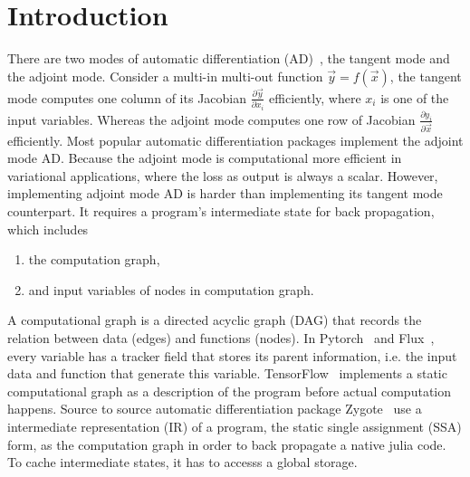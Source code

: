 \documentclass[aps,twocolumn,longbibliography,english,superscriptaddress,prr]{revtex4-1}
\newcommand{\<}{\langle}
\renewcommand{\>}{\rangle}
\newcommand{\vx}{{\vec x}}
\newcommand{\vy}{{\vec y}}
\theoremstyle{definition}\newtheorem{definition}{\textit{Definition}}
\begin{document}
\section{Introduction}\label{sec:intro}
    There are two modes of automatic differentiation (AD)~\cite{Hascoet2013}, the tangent mode and the adjoint mode.
    Consider a multi-in multi-out function $\vy = f(\vx)$, the tangent mode computes one column of its Jacobian $\frac{\partial \vy}{\partial x_i}$ efficiently, where $x_i$ is one of the input variables.
Whereas the adjoint mode computes one row of Jacobian $\frac{\partial y_i}{\partial \vec{x}}$ efficiently.
Most popular automatic differentiation packages implement the adjoint mode AD. Because the adjoint mode is computational more efficient in variational applications, where the loss as output is always a scalar.
However, implementing adjoint mode AD is harder than implementing its tangent mode counterpart. It requires a program's intermediate state for back propagation, which includes
\begin{enumerate}
    \item the computation graph,
    \item and input variables of nodes in computation graph.
\end{enumerate}
    A computational graph is a directed acyclic graph (DAG) that records the relation between data (edges) and functions (nodes).
In Pytorch~\cite{Paszke2017} and Flux~\cite{Innes2018}, every variable has a tracker field that stores its parent information, i.e. the input data and function that generate this variable. TensorFlow~\cite{Tensorflow2015} implements a static computational graph as a description of the program before actual computation happens.
    Source to source automatic differentiation package Zygote~\cite{Innes2018, Innes2019} use a intermediate representation (IR) of a program, the static single assignment (SSA) form, as the computation graph in order to back propagate a native julia code. To cache intermediate states, it has to accesss a global storage.
\end{document}
